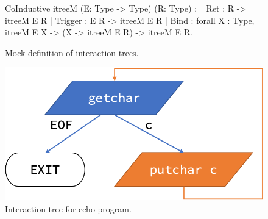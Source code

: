 \begin{figure}
\begin{coq}
  CoInductive itreeM (E: Type -> Type) (R: Type) :=
    Ret     : R   -> itreeM E R
  | Trigger : E R -> itreeM E R
  | Bind    : forall {X : Type}, itreeM E X -> (X -> itreeM E R) -> itreeM E R.
\end{coq}
\vspace*{1em}
\caption{Mock definition of interaction trees.}
\label{fig:mock-itree}
\end{figure}

\begin{figure}
\vspace*{1em}
  \includegraphics[width=.5\linewidth]{figures/echo-itree}
  \caption{Interaction tree for echo program.}
  \label{fig:echo-itree}
\end{figure}


